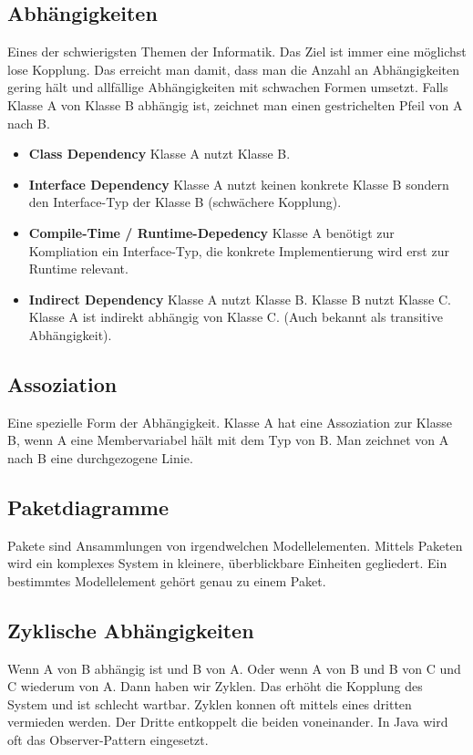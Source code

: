 \subsection{Abhängigkeiten}
Eines der schwierigsten Themen der Informatik. Das Ziel ist immer eine möglichst lose Kopplung. Das erreicht man damit, dass man die Anzahl an Abhängigkeiten gering hält und allfällige Abhängigkeiten mit schwachen Formen umsetzt. Falls Klasse A von Klasse B abhängig ist, zeichnet man einen gestrichelten Pfeil von A nach B.

\begin{itemize}
	\item \textbf{Class Dependency} Klasse A nutzt Klasse B.
	\item \textbf{Interface Dependency} Klasse A nutzt keinen konkrete Klasse B sondern den Interface-Typ der Klasse B (schwächere Kopplung).
	\item \textbf{Compile-Time / Runtime-Depedency} Klasse A benötigt zur Kompliation ein Interface-Typ, die konkrete Implementierung wird erst zur Runtime relevant.
	\item \textbf{Indirect Dependency} Klasse A nutzt Klasse B. Klasse B nutzt Klasse C. Klasse A ist indirekt abhängig von Klasse C. (Auch bekannt als transitive Abhängigkeit).
\end{itemize}

\subsection{Assoziation}
Eine spezielle Form der Abhängigkeit. Klasse A hat eine Assoziation zur Klasse B, wenn A eine Membervariabel hält mit dem Typ von B. Man zeichnet von A nach B eine durchgezogene Linie.

\subsection{Paketdiagramme}
Pakete sind Ansammlungen von irgendwelchen Modellelementen. Mittels Paketen wird ein komplexes System in kleinere, überblickbare Einheiten gegliedert. Ein bestimmtes Modellelement gehört genau zu einem Paket.

\subsection{Zyklische Abhängigkeiten}
Wenn A von B abhängig ist und B von A. Oder wenn A von B und B von C und C wiederum von A. Dann haben wir Zyklen. Das erhöht die Kopplung des System und ist schlecht wartbar. Zyklen konnen oft mittels eines dritten vermieden werden. Der Dritte entkoppelt die beiden voneinander. In Java wird oft das Observer-Pattern eingesetzt.

